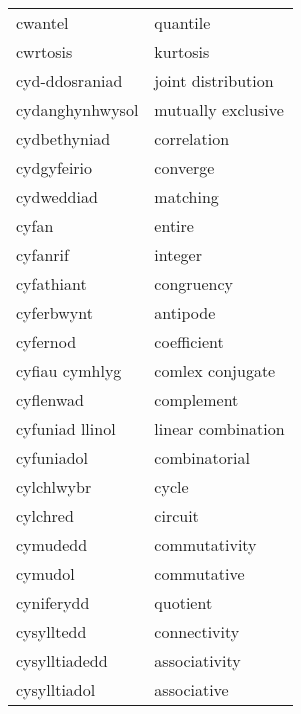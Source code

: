 \begin{supertabular}{p{0.22\textwidth}p{0.22\textwidth}}
                         cwantel &                          quantile \\
                        cwrtosis &                          kurtosis \\
                  cyd-ddosraniad &                joint distribution \\
                 cydanghynhwysol &                mutually exclusive \\
                    cydbethyniad &                       correlation \\
                     cydgyfeirio &                          converge \\
                      cydweddiad &                          matching \\
                           cyfan &                            entire \\
                        cyfanrif &                           integer \\
                      cyfathiant &                        congruency \\
                      cyferbwynt &                          antipode \\
                        cyfernod &                       coefficient \\
                  cyfiau cymhlyg &                  comlex conjugate \\
                       cyflenwad &                        complement \\
                 cyfuniad llinol &                linear combination \\
                      cyfuniadol &                     combinatorial \\
                      cylchlwybr &                             cycle \\
                        cylchred &                           circuit \\
                        cymudedd &                     commutativity \\
                         cymudol &                       commutative \\
                      cyniferydd &                          quotient \\
                      cysylltedd &                      connectivity \\
                   cysylltiadedd &                     associativity \\
                    cysylltiadol &                       associative \\

\end{supertabular}

